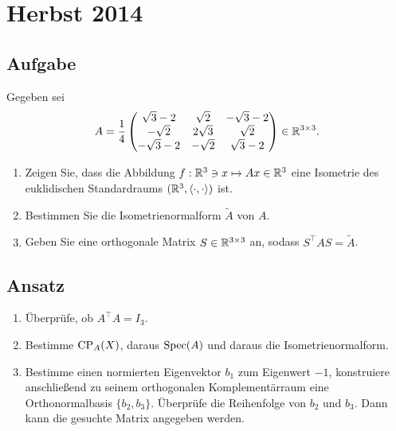 \newpage

\section{Herbst 2014}

\subsection{Aufgabe}
Gegeben sei
\begin{equation*}
	A = \frac{1}{4}\begin{pmatrix}
		\sqrt{3}-2 & \sqrt{2} & -\sqrt{3}-2 \\
		-\sqrt{2} & 2\sqrt{3} & \sqrt{2} \\
		-\sqrt{3}-2 & -\sqrt{2} & \sqrt{3}-2
	\end{pmatrix} \in \mathbb{R}^{3 \times 3}\text{.}
\end{equation*}
\begin{enumerate}
	\item Zeigen Sie, dass die Abbildung \( f: \mathbb{R}^3 \ni x \mapsto Ax \in \mathbb{R}^3 \) eine Isometrie des euklidischen Standardraums \( (\mathbb{R}^3,\langle \cdot, \cdot \rangle) \) ist.
	\item Bestimmen Sie die Isometrienormalform \( \widetilde{A} \) von \( A \).
	\item Geben Sie eine orthogonale Matrix \( S \in \mathbb{R}^{3 \times 3} \) an, sodass \( S^\top AS = \widetilde{A} \). 
\end{enumerate}

\subsection{Ansatz}
\begin{enumerate}
	\item Überprüfe, ob \( A^\top A=I_3 \).
	\item Bestimme \( \text{CP}_A(X) \), daraus \( \text{Spec}(A) \) und daraus die Isometrienormalform.
	\item Bestimme einen normierten Eigenvektor \( b_1 \) zum Eigenwert \( -1 \), konstruiere anschließend zu seinem orthogonalen Komplementärraum eine Orthonormalbasis \( \{ b_2,b_3 \} \). Überprüfe die Reihenfolge von \( b_2 \) und \( b_3 \). Dann kann die gesuchte Matrix angegeben werden.
\end{enumerate}


